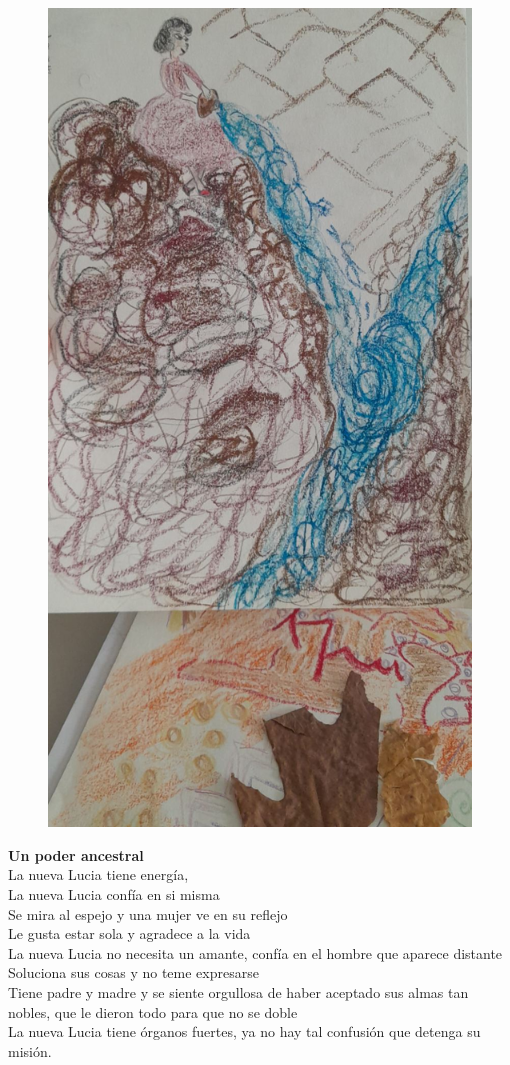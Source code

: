 \documentclass[12pt, a4paper, twoside]{book} %
\begin{document}
\begin{figure}[H]
	\centering
	\includegraphics[width=\textwidth]{./images/1f81324df13197.jpg}
\end{figure}

\noindent\textbf{Un poder ancestral}\\
La nueva Lucia tiene energía,\\
La nueva Lucia confía en si misma\\
Se mira al espejo y una mujer ve en su reflejo\\
Le gusta estar sola y agradece a la vida\\
La nueva Lucia no necesita un amante, confía en el hombre que aparece distante\\
Soluciona sus cosas y no teme expresarse\\
Tiene padre y madre y se siente orgullosa de haber aceptado sus almas tan nobles, que le dieron todo para que no se doble\\
La nueva Lucia tiene órganos fuertes, ya no hay tal confusión que detenga su misión.
\end{document}
